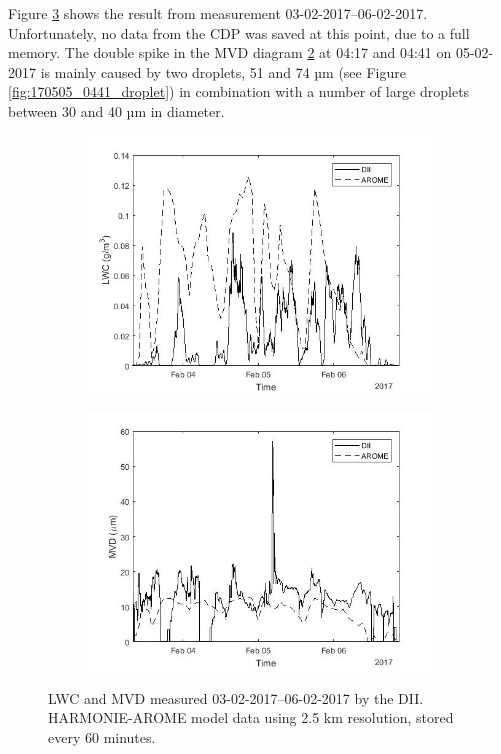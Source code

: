 Figure \ref{fig:0203-0206_lwc_mvd} shows the result from measurement 03-02-2017--06-02-2017. Unfortunately, no data from the CDP was saved at this point, due to a full memory. The double spike in the MVD diagram \ref{fig:0203-0206_MVDvstime} at 04:17 and 04:41 on 05-02-2017 is mainly caused by two droplets, 51 and 74 µm (see Figure \ref{fig:170505_0441_droplet}) in combination with a number of large droplets between 30 and 40 µm in diameter.

\begin{figure}[ht]
\centering
\begin{subfigure}[t]{.5\textwidth}
  \centering
  \includegraphics[width=1\linewidth]{figures/0203-0206/30min_lwc_foggy_smhi_170203-170206_86h}
  \label{fig:0203-0206_LWCvstime}
\end{subfigure}%
\begin{subfigure}[t]{.5\textwidth}
  \centering
  \includegraphics[width=1\linewidth]{figures/0203-0206/30min_mvd_foggy_smhi_170203-170206_86h}
  \label{fig:0203-0206_MVDvstime}
\end{subfigure}
\caption{LWC and MVD measured 03-02-2017--06-02-2017 by the DII. HARMONIE-AROME model data using 2.5 km resolution, stored every 60 minutes.}
\label{fig:0203-0206_lwc_mvd}
\end{figure}

